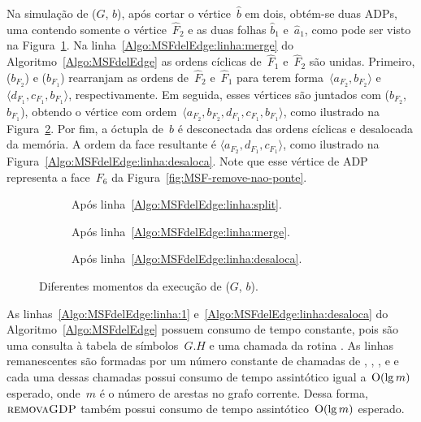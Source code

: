 Na simulação de \MSFdelEdge($G$, $b$), após cortar o vértice~$\hat b$ em dois, obtém-se duas ADPs, uma contendo somente o vértice~$\hat F_2$ e as duas folhas $\hat b_1$ e~$\hat a_1$, como pode ser visto na Figura~\ref{fig:MSF-remove-aresta-ex-1}.
Na linha~\ref{Algo:MSFdelEdge:linha:merge} do Algoritmo~\ref{Algo:MSFdelEdge} as ordens cíclicas de~$\hat F_1$ e~$\hat F_2$ são unidas.
Primeiro, \LCOCycle($b_{F_2}$) e \LCOCycle($b_{F_1}$) rearranjam as ordens de~$\hat F_2$ e~$\hat F_1$ para terem forma~$\langle  a_{F_2}, b_{F_2} \rangle$ e~$\langle d_{F_1}, c_{F_1}, b_{F_1}\rangle$, respectivamente.
Em seguida, esses vértices são juntados com \LCOMerge($b_{F_2}$, $b_{F_1}$), obtendo o vértice com ordem~$\langle a_{F_2}, b_{F_2}, d_{F_1}, c_{F_1}, b_{F_1}\rangle$, como ilustrado na Figura~\ref{fig:MSF-remove-aresta-ex-2}.
Por fim, a óctupla de~$b$ é desconectada das ordens cíclicas e desalocada da memória.
A ordem da face resultante é $\langle a_{F_2}, d_{F_1}, c_{F_1}\rangle$, como ilustrado na Figura~\ref{Algo:MSFdelEdge:linha:desaloca}.
Note que esse vértice de ADP representa a face~$F_6$ da Figura~\ref{fig:MSF-remove-nao-ponte}. 

\begin{figure}[h!]
\begin{subfigure}{.2\textwidth}

\caption{Após linha~\ref{Algo:MSFdelEdge:linha:split}.}
\label{fig:MSF-remove-aresta-ex-1}
\end{subfigure}
\hfill
\begin{subfigure}{.2\textwidth}

\caption{Após linha~\ref{Algo:MSFdelEdge:linha:merge}.}
\label{fig:MSF-remove-aresta-ex-2}
\end{subfigure}
\hfill
\begin{subfigure}{.2\textwidth}

\caption{Após linha~\ref{Algo:MSFdelEdge:linha:desaloca}.}
\label{fig:MSF-remove-aresta-ex-3}
\end{subfigure}
\caption{Diferentes momentos da execução de \MSFdelEdge($G$, $b$).}
\label{fig:MSF-remocao-b}
\end{figure}


As linhas~\ref{Algo:MSFdelEdge:linha:1} e~\ref{Algo:MSFdelEdge:linha:desaloca} do Algoritmo~\ref{Algo:MSFdelEdge} possuem consumo de tempo constante, pois são uma consulta à tabela de símbolos~$G.H$ e uma chamada da rotina \LCODestroyOcto{}.
As linhas remanescentes são formadas por um número constante de chamadas de \LCOFindNode, \LCOCycle{}, \LCOMerge{}, \LCOSplit{} e \MSFupdate{} e cada uma dessas chamadas possui consumo de tempo assintótico igual a~$\mathrm{O}(\lg m)$ esperado, onde~$m$ é o número de arestas no grafo corrente.
Dessa forma, $\text{\scshape removaGDP}$ também possui consumo de tempo assintótico~$\mathrm{O}(\lg m)$ esperado.


